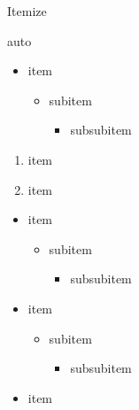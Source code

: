\documentclass[english,aspectratio=169,t,9pt]{beamer}
\begin{document}
\begin{frame}{Itemize}
	\begin{cols}{auto}
		\begin{comsysblueblock}
			\begin{itemize}
			\item item
				\begin{itemize}
				\item subitem
					\begin{itemize}
					\item subsubitem
					\end{itemize}
				\end{itemize}
			\end{itemize}
		\end{comsysblueblock}
		\begin{comsysblueblock}
			\begin{enumerate}
			\item item
			\item item
			\end{enumerate}
		\end{comsysblueblock}
	\col
		\begin{comsysgreenblock}
			\begin{itemize}
			\item item
				\begin{itemize}
				\item subitem
					\begin{itemize}
					\item subsubitem
					\end{itemize}
				\end{itemize}
			\end{itemize}
		\end{comsysgreenblock}
		\begin{comsysredblock}
			\begin{itemize}
			\item item
				\begin{itemize}
				\item subitem
					\begin{itemize}
					\item subsubitem
					\end{itemize}
				\end{itemize}
			\end{itemize}
		\end{comsysredblock}
	\col
		\begin{comsyswhiteblock}{}
			\begin{itemize}
			\item item
				\begin{itemize}

\end{itemize}
\end{itemize}
\end{comsyswhiteblock}
\end{cols}
\end{frame}
\end{document}
